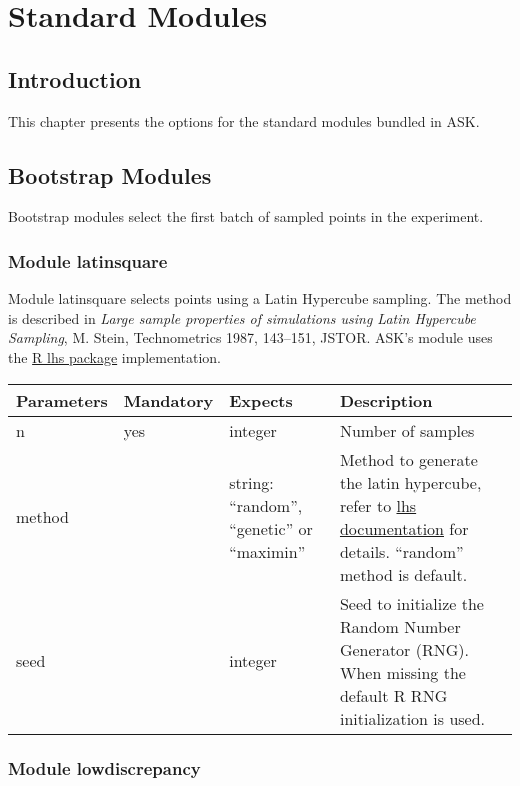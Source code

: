 \chapter{Standard Modules}
\section{Introduction}

This chapter presents the options for the standard modules bundled in ASK.

\section{Bootstrap Modules}

Bootstrap modules select the first batch of sampled points in the experiment.

\subsection{Module latinsquare}

Module latinsquare selects points using a Latin Hypercube sampling. The method is described in \emph{Large sample properties of simulations using Latin Hypercube Sampling}, M. Stein, Technometrics 1987, 143--151, JSTOR. ASK's module uses the \href{http://cran.r-project.org/web/packages/lhs/}{R lhs package} implementation.

	\vspace{0.5cm}\begin{tabular}{| p{} | p{} | p{} | p{}  |}
		\hline
		\textbf{ Parameters} & \textbf{ Mandatory} & \textbf{ Expects} & \textbf{ Description} \\ \hline
		 n &  yes &  integer &  Number of samples \\ \hline
		 method &   &  string: ``random'', ``genetic'' or ``maximin'' &  Method to generate the latin hypercube, refer to \href{http://cran.r-project.org/web/packages/lhs/}{lhs documentation} for details. ``random'' method is default. \\ \hline
		 seed &   &  integer &  Seed to initialize the Random Number Generator (RNG). When missing the default R RNG initialization is used. \\ \hline
	\end{tabular}

\subsection{Module lowdiscrepancy}

